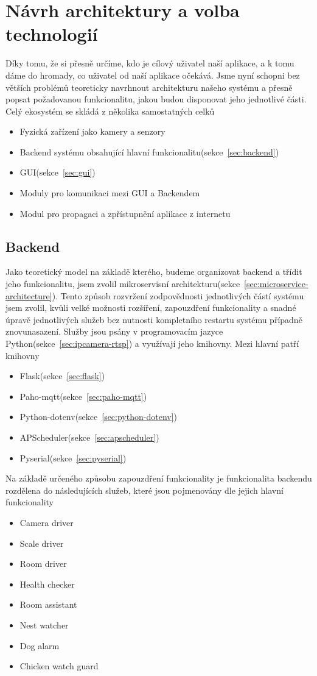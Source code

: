 \section{Návrh architektury a volba technologií}
Díky tomu, že si přesně určíme, kdo je cílový uživatel naší aplikace, a k tomu dáme do hromady, co uživatel od naší aplikace očekává.
Jsme nyní schopni bez větších problémů teoreticky navrhnout architekturu našeho systému a přesně popsat požadovanou funkcionalitu, jakou budou disponovat jeho jednotlivé části.
Celý ekosystém se skládá z několika samostatných celků
\begin{itemize}
    \item Fyzická zařízení jako kamery a senzory
    \item Backend systému obsahující hlavní funkcionalitu(sekce~\ref{sec:backend})
    \item GUI(sekce~\ref{sec:gui})
    \item Moduly pro komunikaci mezi GUI a Backendem
    \item Modul pro propagaci a zpřístupnění aplikace z internetu
\end{itemize}

\subsection{Backend}
Jako teoretický model na základě kterého, budeme organizovat backend a třídit jeho funkcionalitu, jsem zvolil mikroservisní architekturu(sekce~\ref{sec:microservice-architecture}).
Tento způsob rozvržení zodpovědnosti jednotlivých částí systému jsem zvolil, kvůli velké možnosti rozšíření, zapouzdření funkcionality a snadné úpravě jednotlivých služeb bez nutnosti kompletního restartu systému případně znovunasazení.
Služby jsou psány v programovacím jazyce Python(sekce~\ref{sec:ipcamera-rtsp}) a využívají jeho knihovny.
Mezi hlavní patří knihovny
\begin{itemize}
    \item Flask(sekce~\ref{sec:flask})
    \item Paho-mqtt(sekce~\ref{sec:paho-mqtt})
    \item Python-dotenv(sekce~\ref{sec:python-dotenv})
    \item APScheduler(sekce~\ref{sec:apscheduler})
    \item Pyserial(sekce~\ref{sec:pyserial})
\end{itemize}
Na základě určeného způsobu zapouzdření funkcionality je funkcionalita backendu rozdělena do následujících služeb, které jsou pojmenovány dle jejich hlavní funkcionality
\begin{itemize}
    \item Camera driver
    \item Scale driver
    \item Room driver
    \item Health checker
    \item Room assistant
    \item Nest watcher
    \item Dog alarm
    \item Chicken watch guard
\end{itemize}


